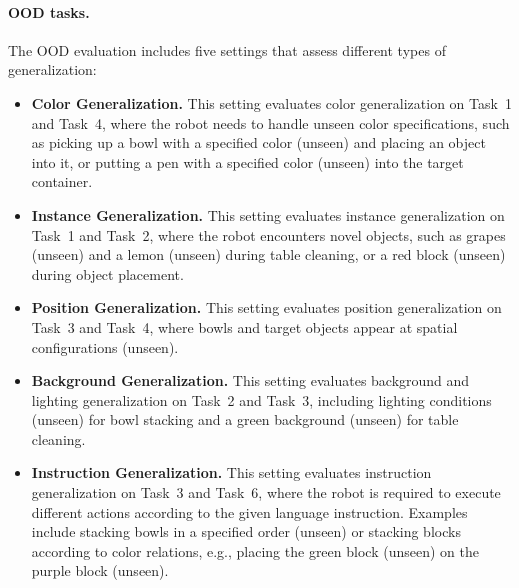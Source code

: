 \documentclass{article}
\begin{document}
\paragraph{OOD tasks.}
The OOD evaluation includes five settings that assess different types of generalization:
\begin{itemize}[leftmargin=*,itemsep=2pt]
    \item \textbf{Color Generalization.} This setting evaluates color generalization on Task~1 and Task~4, where the robot needs to handle unseen color specifications, such as picking up a bowl with a specified color (unseen) and placing an object into it, or putting a pen with a specified color (unseen) into the target container.
    
    \item \textbf{Instance Generalization.} This setting evaluates instance generalization on Task~1 and Task~2, where the robot encounters novel objects, such as grapes (unseen) and a lemon (unseen) during table cleaning, or a red block (unseen) during object placement.
    
    \item \textbf{Position Generalization.} This setting evaluates position generalization on Task~3 and Task~4, where bowls and target objects appear at spatial configurations (unseen).
    
    \item \textbf{Background Generalization.} This setting evaluates background and lighting generalization on Task~2 and Task~3, including lighting conditions (unseen) for bowl stacking and a green background (unseen) for table cleaning.
    
    \item \textbf{Instruction Generalization.} This setting evaluates instruction generalization on Task~3 and Task~6, where the robot is required to execute different actions according to the given language instruction. Examples include stacking bowls in a specified order (unseen) or stacking blocks according to color relations, e.g., placing the green block (unseen) on the purple block (unseen).
\end{itemize}
\end{document}
